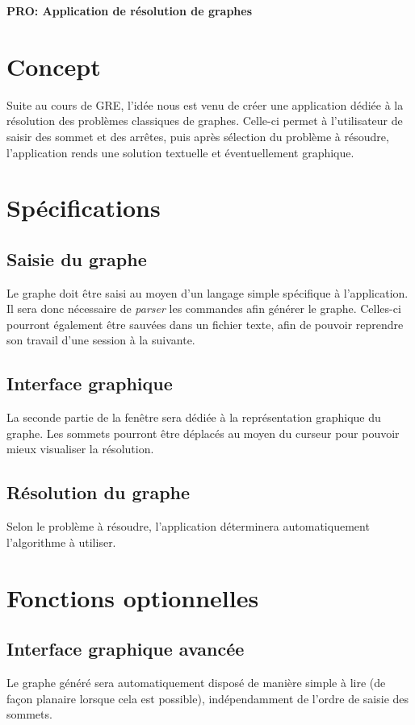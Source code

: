 \documentclass[french]{article}
\begin{document}
	\centering
	\large{\textbf{PRO: Application de résolution de graphes}}
	
	\justify
	
	\section{Concept}
		Suite au cours de GRE, l'idée nous est venu de créer une application dédiée à la résolution des problèmes classiques de graphes. Celle-ci permet à l'utilisateur de saisir des sommet et des arrêtes, puis après sélection du problème à résoudre, l'application rends une solution textuelle et éventuellement graphique.
		
	\section{Spécifications}
		\subsection{Saisie du graphe}
			Le graphe doit être saisi au moyen d'un langage simple spécifique à l'application. Il sera donc nécessaire de \textit{parser} les commandes afin générer le graphe. Celles-ci pourront également être sauvées dans un fichier texte, afin de pouvoir reprendre son travail d'une session à la suivante.
		
		\subsection{Interface graphique}
			La seconde partie de la fenêtre sera dédiée à la représentation graphique du graphe. Les sommets pourront être déplacés au moyen du curseur pour pouvoir mieux visualiser la résolution.
		
		\subsection{Résolution du graphe}
			Selon le problème à résoudre, l'application déterminera automatiquement l'algorithme à utiliser.
	
	\section{Fonctions optionnelles}
		\subsection{Interface graphique avancée}
			Le graphe généré sera automatiquement disposé de manière simple à lire (de façon planaire lorsque cela est possible), indépendamment de l'ordre de saisie des sommets. 
		
\end{document}
